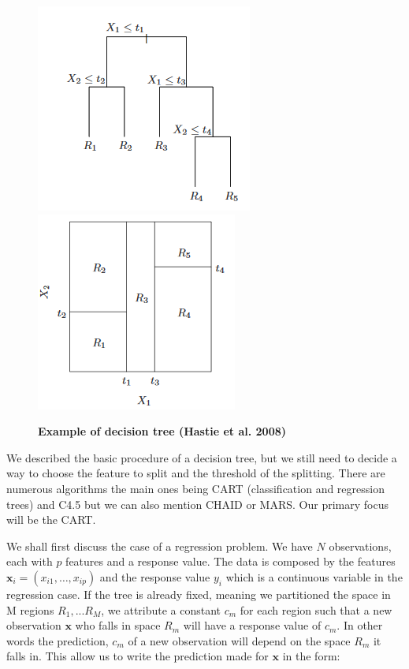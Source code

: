 \documentclass[a4paper,12pt]{article}
\numberwithin{equation}{section}
\begin{document}
\begin{figure}[H]%
    \begin{center}
    \includegraphics[scale = 0.8]{Figure1RF.png}%
    \qquad
    \includegraphics[scale = 0.8]{Figure2RF.png}%
    \caption{\textbf{Example of decision tree (Hastie et al. 2008)}}%
    \label{fig:DecisionTree}%
    \end{center}
\end{figure}


We described the basic procedure of a decision tree, but we still need to decide a way to choose the feature to split and the threshold of the splitting. There are numerous algorithms the main ones being CART (classification and regression trees) and C4.5 but we can also mention CHAID or MARS. Our primary focus will be the CART. 

We shall first discuss the case of a regression problem. We have $N$ observations, each with $p$ features and a response value. The data is composed by the features $\boldsymbol{x}_i=(x_{i1},\dots,x_{ip})$ and the response value $y_i$ which is a continuous variable in the regression case. If the tree is already fixed, meaning we partitioned the space in M regions $R_1,...R_M$, we attribute a constant $c_m$ for each region such that a new observation $\boldsymbol{x}$ who falls in space $R_m$ will have a response value of $c_m$. In other words the prediction, $c_m$ of a new observation will depend on the space $R_m$ it falls in. This allow us to write the prediction made for $\boldsymbol{x}$ in the form:
\end{document}

